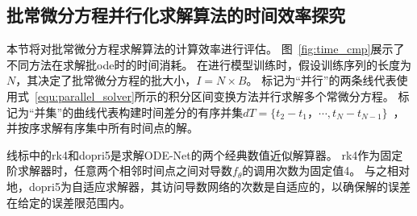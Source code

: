 \subsection{批常微分方程并行化求解算法的时间效率探究}
\label{sec:5_parallel_experiment}
本节将对批常微分方程求解算法的计算效率进行评估。
图~\ref{fig:time_cmp}展示了不同方法在求解批ode时的时间消耗。
在进行模型训练时，假设训练序列的长度为$N$，其决定了批常微分方程的批大小，$I=N\times B$。
标记为“并行”的两条线代表使用式~\eqref{equ:parallel_solver}所示的积分区间变换方法并行求解多个常微分方程。
标记为“并集”的曲线代表构建时间差分的有序并集$dT=\{t_2-t_1，\cdots, t_N-t_{N-1}\}$~\cite{yildiz2021continuous,Rubanova2019}，并按序求解有序集中所有时间点的解。

线标中的rk4和dopri5\cite{chen2018neuralode,Yuan2022}是求解ODE-Net的两个经典数值近似解算器。
rk4作为固定阶求解器时，任意两个相邻时间点之间对导数$f_\theta$的调用次数为固定值4。
与之相对地，dopri5为自适应求解器，其访问导数网络的次数是自适应的，以确保解的误差在给定的误差限范围内。

